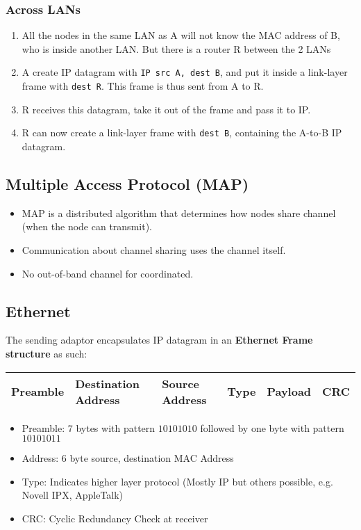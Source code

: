 \documentclass[a4paper]{article}
\begin{document}
\subsubsection{Across LANs}
\begin{enumerate}
    \item All the nodes in the same LAN as A will not know the MAC address of B, who is inside another LAN. But there is a router R between the 2 LANs
    \item A create IP datagram with \texttt{IP src A, dest B}, and put it inside a link-layer frame with \texttt{dest R}. This frame is thus sent from A to R.
    \item R receives this datagram, take it out of the frame and pass it to IP.
    \item R can now create a link-layer frame with \texttt{dest B}, containing the A-to-B IP datagram.
\end{enumerate}

\subsection{Multiple Access Protocol (MAP)}
\begin{itemize}
    \item MAP is a distributed algorithm that determines how nodes share channel (when the node can transmit).
    \item Communication about channel sharing uses the channel itself.
    \item No out-of-band channel for coordinated.
\end{itemize}

\subsection{Ethernet}
The sending adaptor encapsulates IP datagram in an \textbf{Ethernet Frame structure} as such:
\begin{table}[H]
    \centering
    \begin{tabular}{|l|l|l|l|l|l|}
    \hline
    \textbf{Preamble} & \textbf{Destination Address} & \textbf{Source Address} & \textbf{Type} & \textbf{Payload} & \textbf{CRC} \\ \hline
    \end{tabular}
\end{table}
\begin{itemize}
    \item Preamble: 7 bytes with pattern $10101010$ followed by one byte with pattern $10101011$
    \item Address: 6 byte source, destination MAC Address
    \item Type: Indicates higher layer protocol (Mostly IP but others possible, e.g. Novell IPX, AppleTalk)
    \item CRC: Cyclic Redundancy Check at receiver
\end{itemize}
\end{document}
